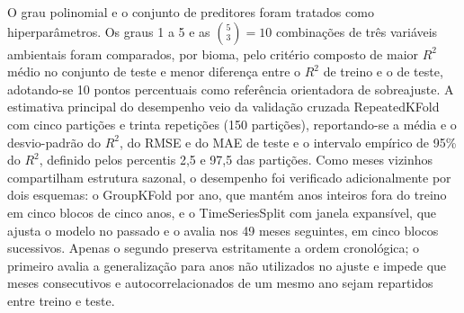\documentclass[a4paper,fleqn]{cas-dc}
\begin{document}
O grau polinomial e o conjunto de preditores foram tratados como hiperparâmetros. Os graus 1 a 5 e as $\binom{5}{3} = 10$ combinações de três variáveis ambientais foram comparados, por bioma, pelo critério composto de maior $R^2$ médio no conjunto de teste e menor diferença entre o $R^2$ de treino e o de teste, adotando-se 10 pontos percentuais como referência orientadora de sobreajuste. A estimativa principal do desempenho veio da validação cruzada RepeatedKFold com cinco partições e trinta repetições (150 partições), reportando-se a média e o desvio-padrão do $R^2$, do RMSE e do MAE de teste e o intervalo empírico de 95\% do $R^2$, definido pelos percentis 2,5 e 97,5 das partições. Como meses vizinhos compartilham estrutura sazonal, o desempenho foi verificado adicionalmente por dois esquemas: o GroupKFold por ano, que mantém anos inteiros fora do treino em cinco blocos de cinco anos, e o TimeSeriesSplit com janela expansível, que ajusta o modelo no passado e o avalia nos 49 meses seguintes, em cinco blocos sucessivos. Apenas o segundo preserva estritamente a ordem cronológica; o primeiro avalia a generalização para anos não utilizados no ajuste e impede que meses consecutivos e autocorrelacionados de um mesmo ano sejam repartidos entre treino e teste.
\end{document}
